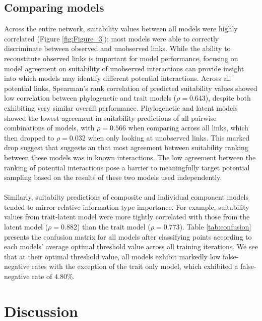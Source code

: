 \subsection*{Comparing models}
Across the entire network, suitability values between all models were highly correlated (Figure \ref{fig:Figure_3}); most models were able to correctly discriminate between observed and unobserved links. While the ability to reconstitute observed links is important for model performance, focusing on model agreement on suitability of unobserved interactions can provide insight into which models may identify different potential interactions. Across all potential links, Spearman's rank correlation of predicted suitability values showed low correlation between phylogenetic and trait models ($\rho = 0.643$), despite both exhibiting very similar overall performance. Phylogenetic and latent models showed the lowest agreement in suitability predictions of all pairwise combinations of models, with $\rho = 0.566$ when comparing across all links, which then dropped to $\rho = 0.032$ when only looking at unobserved links. This marked drop suggest that suggests an that most agreement between suitability ranking between these models was in known interactions. The low agreement between the ranking of potential interactions pose a barrier to meaningfully target potential sampling based on the results of these two models used independently.

\paragraph*{}
Similarly, suitabilty predictions of composite and individual component models tended to mirror relative information type importance. For example, suitability values from trait-latent model were more tightly correlated with those from the latent model ($\rho=0.882$) than the trait model ($\rho=0.773$). Table \ref{tab:confusion} presents the confusion matrix for all models after classifying points according to each models' average optimal threshold value across all training iterations. We see that at their optimal threshold value, all models exhibit markedly low false-negative rates with the exception of the trait only model, which exhibited a false-negative rate of $4.80\%$.








\section*{Discussion}
